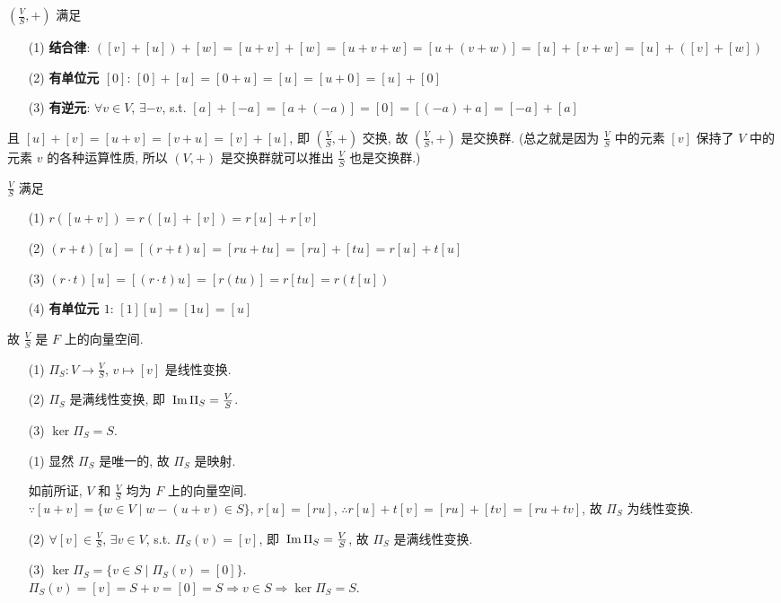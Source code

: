 \documentclass{note}
\begin{document}
\begin{pf}
    $(\frac{V}{S},+)$ 满足
    \begin{itemize}
        \item[(1)] \textbf{结合律}: $([v]+[u])+[w]=[u+v]+[w]=[u+v+w]=[u+(v+w)]=[u]+[v+w]=[u]+([v]+[w])$
        \item[(2)] \textbf{有单位元 $[0]$}: $[0]+[u]=[0+u]=[u]=[u+0]=[u]+[0]$
        \item[(3)] \textbf{有逆元}: $\forall v\in V$, $\exists-v$, s.t. $[a]+[-a]=[a+(-a)]=[0]=[(-a)+a]=[-a]+[a]$
    \end{itemize}
    且 $[u]+[v]=[u+v]=[v+u]=[v]+[u]$, 即 $(\frac{V}{S},+)$ 交换, 故 $(\frac{V}{S},+)$ 是交换群. (总之就是因为 $\frac{V}{S}$ 中的元素 $[v]$ 保持了 $V$ 中的元素 $v$ 的各种运算性质, 所以 $(V,+)$ 是交换群就可以推出 $\frac{V}{S}$ 也是交换群.)

    $\frac{V}{S}$ 满足
    \begin{itemize}
        \item[(1)] $r([u+v])=r([u]+[v])=r[u]+r[v]$
        \item[(2)] $(r+t)[u]=[(r+t)u]=[ru+tu]=[ru]+[tu]=r[u]+t[u]$
        \item[(3)] $(r\cdot t)[u]=[(r\cdot t)u]=[r(tu)]=r[tu]=r(t[u])$
        \item[(4)] \textbf{有单位元 $1$}: $[1][u]=[1u]=[u]$
    \end{itemize}
    故 $\frac{V}{S}$ 是 $F$ 上的向量空间.
\end{pf}

\begin{thm}[(课本定理 3.2)]
    \begin{itemize}
        \item[(1)] $\Pi_S:V\rightarrow\frac{V}{S}$, $v\mapsto[v]$ 是线性变换.
        \item[(2)] $\Pi_S$ 是满线性变换, 即 $\,\mathrm{Im}\,\Pi_S=\frac{V}{S}$.
        \item[(3)] $\ker\Pi_S=S$.
    \end{itemize}
\end{thm}
\begin{pf}
    \begin{itemize}
        \item[(1)] 显然 $\Pi_S$ 是唯一的, 故 $\Pi_S$ 是映射.

        如前所证, $V$ 和 $\frac{V}{S}$ 均为 $F$ 上的向量空间.\\
        $\because[u+v]=\{w\in V\mid w-(u+v)\in S\}$, $r[u]=[ru]$, $\therefore r[u]+t[v]=[ru]+[tv]=[ru+tv]$, 故 $\Pi_S$ 为线性变换.
        \item[(2)] $\forall[v]\in\frac{V}{S}$, $\exists v\in V$, s.t. $\Pi_S(v)=[v]$, 即 $\,\mathrm{Im}\,\Pi_S=\frac{V}{S}$, 故 $\Pi_S$ 是满线性变换.
        \item[(3)] $\ker\Pi_S=\{v\in S\mid\Pi_S(v)=[0]\}$.\\
        $\Pi_S(v)=[v]=S+v=[0]=S\Longrightarrow v\in S\Longrightarrow\ker\Pi_S=S$.
    \end{itemize}
\end{pf}
\end{document}

